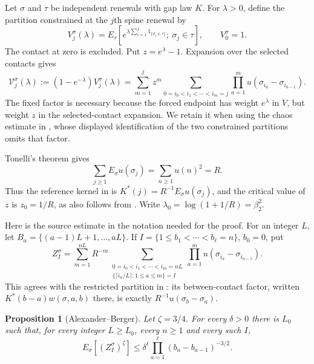 \documentclass[11pt]{article}
\newtheorem{proposition}[proposition]{Proposition}
\theoremstyle{remark}
\numberwithin{equation}{section}
\begin{document}
Let $\sigma$ and $\tau$ be independent renewals with gap law $K$. For
$\lambda>0$, define the partition constrained at the $j$th spine renewal by
\[
 V_j^\sigma(\lambda)=E_\tau\left[
 e^{\lambda\sum_{i=1}^j1_{\{\sigma_i\in\tau\}}};\ \sigma_j\in\tau\right],
 \qquad V_0^\sigma=1.
\]
The contact at zero is excluded. Put $z=e^\lambda-1$. Expansion over the
selected contacts gives
\begin{equation}\label{eq:chaos}
 \mathcal V_j^\sigma(\lambda):=(1-e^{-\lambda})V_j^\sigma(\lambda)
 =\sum_{m=1}^j z^m
   \sum_{0=i_0<i_1<\cdots<i_m=j}
       \prod_{a=1}^m u(\sigma_{i_a}-\sigma_{i_{a-1}}).
\end{equation}
The fixed factor is necessary because the forced endpoint has weight
$e^\lambda$ in $V$, but weight $z$ in the selected-contact expansion.
We retain it when using the chaos estimate in \cite[Section~4]{AB}, whose
displayed identification of the two constrained partitions omits that factor.

Tonelli's theorem gives
\[
 \sum_{j\ge1}E_\sigma u(\sigma_j)=\sum_{n\ge1}u(n)^2=R.
\]
Thus the reference kernel in \cite[(4.2)]{AB} is
$K^*(j)=R^{-1}E_\sigma u(\sigma_j)$, and the critical value of $z$ is
$z_0=1/R$, as also follows from \cite[Proposition~1.3]{AB}.
Write $\lambda_0=\log(1+1/R)=\beta_2^2$.

Here is the source estimate in the notation needed for the proof. For an
integer $L$, let $B_a=\{(a-1)L+1,\ldots,aL\}$. If
$I=\{1\le b_1<\cdots<b_\ell=n\}$, $b_0=0$, put
\begin{equation}\label{eq:restricted-chaos}
 Z_I^\sigma=\sum_{m=1}^{nL} R^{-m}
  \sum_{\substack{0=i_0<i_1<\cdots<i_m=nL\\
        \{\lceil i_a/L\rceil:1\le a\le m\}=I}}
       \prod_{a=1}^m u(\sigma_{i_a}-\sigma_{i_{a-1}}).
\end{equation}
This agrees with the restricted partition in \cite[(4.10)]{AB}: its
between-contact factor, written $K^*(b-a)w(\sigma,a,b)$ there, is exactly
$R^{-1}u(\sigma_b-\sigma_a)$.

\begin{proposition}[Alexander--Berger]\label{prop:AB}
Let $\zeta=3/4$. For every $\delta>0$ there is $L_0$ such that, for
every integer $L\ge L_0$, every $n\ge1$ and every such $I$,
\begin{equation}\label{eq:AB}
 E_\sigma[(Z_I^\sigma)^\zeta]
 \le\delta^\ell\prod_{a=1}^\ell(b_a-b_{a-1})^{-3/2}.
\end{equation}
\end{proposition}
\end{document}
